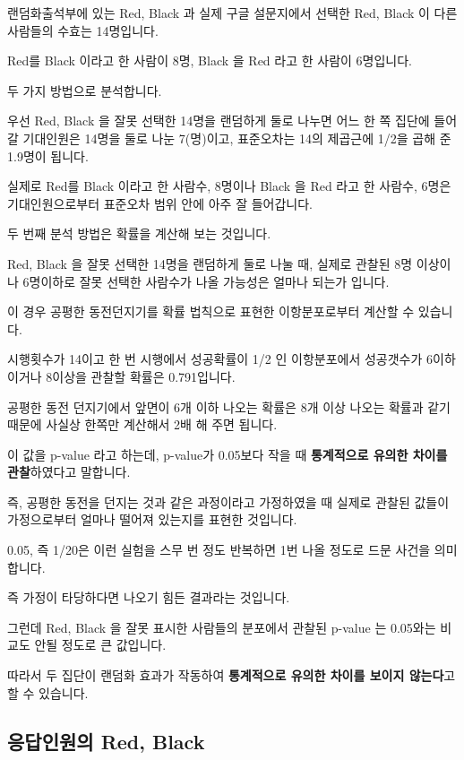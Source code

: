 \documentclass[
]{book}
\begin{document}
랜덤화출석부에 있는 Red, Black 과 실제 구글 설문지에서 선택한 Red, Black 이 다른 사람들의 수효는 14명입니다.

Red를 Black 이라고 한 사람이 8명, Black 을 Red 라고 한 사람이 6명입니다.

두 가지 방법으로 분석합니다.

우선 Red, Black 을 잘못 선택한 14명을 랜덤하게 둘로 나누면 어느 한 쪽 집단에 들어갈 기대인원은 14명을 둘로 나눈 7(명)이고, 표준오차는 14의 제곱근에 1/2을 곱해 준 1.9명이 됩니다.

실제로 Red를 Black 이라고 한 사람수, 8명이나 Black 을 Red 라고 한 사람수, 6명은 기대인원으로부터 표준오차 범위 안에 아주 잘 들어갑니다.

두 번째 분석 방법은 확률을 계산해 보는 것입니다.

Red, Black 을 잘못 선택한 14명을 랜덤하게 둘로 나눌 때, 실제로 관찰된 8명 이상이나 6명이하로 잘못 선택한 사람수가 나올 가능성은 얼마나 되는가 입니다.

이 경우 공평한 동전던지기를 확률 법칙으로 표현한 이항분포로부터 계산할 수 있습니다.

시행횟수가 14이고 한 번 시행에서 성공확률이 1/2 인 이항분포에서 성공갯수가 6이하이거나 8이상을 관찰할 확률은 0.791입니다.

공평한 동전 던지기에서 앞면이 6개 이하 나오는 확률은 8개 이상 나오는 확률과 같기 때문에 사실상 한쪽만 계산해서 2배 해 주면 됩니다.

이 값을 p-value 라고 하는데, p-value가 0.05보다 작을 때 \textbf{통계적으로 유의한 차이를 관찰}하였다고 말합니다.

즉, 공평한 동전을 던지는 것과 같은 과정이라고 가정하였을 때 실제로 관찰된 값들이 가정으로부터 얼마나 떨어져 있는지를 표현한 것입니다.

0.05, 즉 1/20은 이런 실험을 스무 번 정도 반복하면 1번 나올 정도로 드문 사건을 의미합니다.

즉 가정이 타당하다면 나오기 힘든 결과라는 것입니다.

그런데 Red, Black 을 잘못 표시한 사람들의 분포에서 관찰된 p-value 는 0.05와는 비교도 안될 정도로 큰 값입니다.

따라서 두 집단이 랜덤화 효과가 작동하여 \textbf{통계적으로 유의한 차이를 보이지 않는다}고 할 수 있습니다.

\subsection{응답인원의 Red, Black}\label{uxc751uxb2f5uxc778uxc6d0uxc758-red-black}
\end{document}
